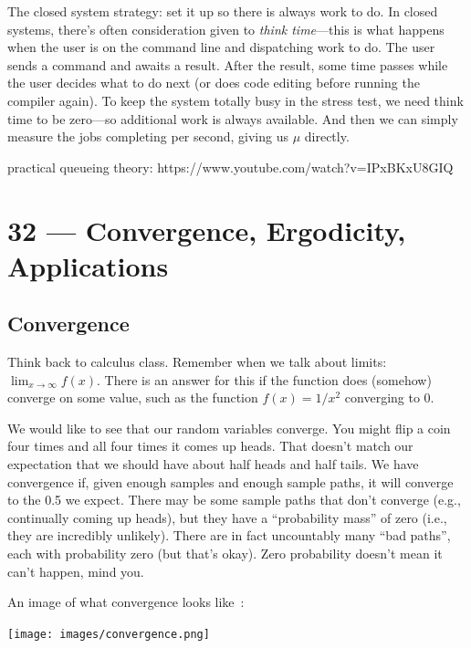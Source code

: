 \documentclass[a4paper]{report}
\begin{document}
The closed system strategy: set it up so there is always work to do. In closed systems, there's often consideration given to \textit{think time}---this is what happens when the user is on the command line and dispatching work to do. The user sends a command and awaits a result. After the result, some time passes while the user decides what to do next (or does code editing before running the compiler again). To keep the system totally busy in the stress test, we need think time to be zero---so additional work is always available. And then we can simply measure the jobs completing per second, giving us $\mu$ directly.




practical queueing theory:  https://www.youtube.com/watch?v=IPxBKxU8GIQ





\chapter*{32 --- Convergence, Ergodicity, Applications}


\section*{Convergence}

Think back to calculus class. Remember when we talk about limits: $\lim_{x\to\infty} f(x)$. There is an answer for this if the function does (somehow) converge on some value, such as the function $f(x) = 1/x^{2}$ converging to 0.

We would like to see that our random variables converge. You might flip a coin four times and all four times it comes up heads. That doesn't match our expectation that we should have about half heads and half tails. We have convergence if, given enough samples and enough sample paths, it will converge to the 0.5 we expect. There may be some sample paths that don't converge (e.g., continually coming up heads), but they have a ``probability mass'' of zero (i.e., they are incredibly unlikely).  There are in fact uncountably many ``bad paths'', each with probability zero (but that's okay). Zero probability doesn't mean it can't happen, mind you.

An image of what convergence looks like~\cite{pmd}:

\begin{center}
	\texttt{[image: images/convergence.png]}
\end{center}
\end{document}
